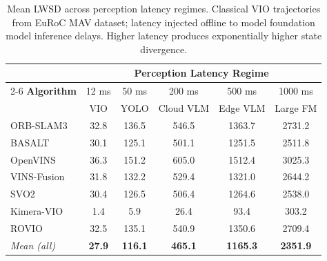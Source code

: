 \begin{table}[t]
\centering
\caption{Mean LWSD across perception latency regimes. Classical VIO trajectories from EuRoC MAV dataset; latency injected offline to model foundation model inference delays. Higher latency produces exponentially higher state divergence.}
\label{tab:layer0_regimes}
\begin{tabular}{@{}lccccc@{}}
\toprule
& \multicolumn{5}{c}{\textbf{Perception Latency Regime}} \\
\cmidrule(lr){2-6}
\textbf{Algorithm} & 12 ms & 50 ms & 200 ms & 500 ms & 1000 ms \\
& \scriptsize{VIO} & \scriptsize{YOLO} & \scriptsize{Cloud VLM} & \scriptsize{Edge VLM} & \scriptsize{Large FM} \\
\midrule
ORB-SLAM3 & 32.8 & 136.5 & 546.5 & 1363.7 & 2731.2 \\
BASALT & 30.1 & 125.1 & 501.1 & 1251.5 & 2511.8 \\
OpenVINS & 36.3 & 151.2 & 605.0 & 1512.4 & 3025.3 \\
VINS-Fusion & 31.8 & 132.2 & 529.4 & 1321.0 & 2644.2 \\
SVO2 & 30.4 & 126.5 & 506.4 & 1264.6 & 2538.0 \\
Kimera-VIO & 1.4 & 5.9 & 26.4 & 93.4 & 303.2 \\
ROVIO & 32.5 & 135.1 & 540.9 & 1350.6 & 2709.4 \\
\midrule
\textit{Mean (all)} & \textbf{27.9} & \textbf{116.1} & \textbf{465.1} & \textbf{1165.3} & \textbf{2351.9} \\
\bottomrule
\end{tabular}
\end{table}

